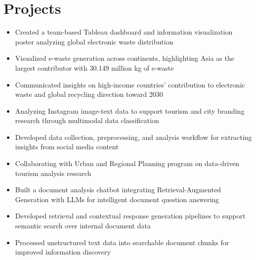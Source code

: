 \section*{Projects}
\begin{itemize}
  \item Created a team-based Tableau dashboard and information visualization poster analyzing global electronic waste distribution
  \item Visualized e-waste generation across continents, highlighting Asia as the largest contributor with 30.149 million kg of e-waste
  \item Communicated insights on high-income countries' contribution to electronic waste and global recycling direction toward 2030
\end{itemize}

\begin{itemize}
  \item Analyzing Instagram image-text data to support tourism and city branding research through multimodal data classification
  \item Developed data collection, preprocessing, and analysis workflow for extracting insights from social media content
  \item Collaborating with Urban and Regional Planning program on data-driven tourism analysis research
\end{itemize}

\begin{itemize}
  \item Built a document analysis chatbot integrating Retrieval-Augmented Generation with LLMs for intelligent document question answering
  \item Developed retrieval and contextual response generation pipelines to support semantic search over internal document data
  \item Processed unstructured text data into searchable document chunks for improved information discovery
\end{itemize}

